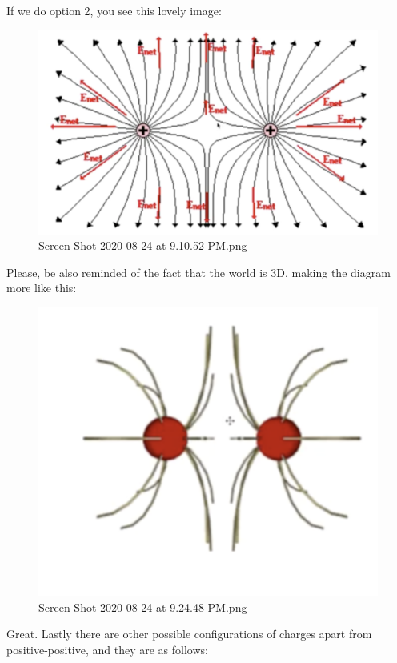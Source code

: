\documentclass[letterpaper]{article}
\begin{document}
If we do option 2, you see this lovely image:

\begin{figure}[htbp]
\centering
\includegraphics[width=.9\linewidth]{./Screen Shot 2020-08-24 at 9.10.52 PM.png}
\caption{Screen Shot 2020-08-24 at 9.10.52 PM.png}
\end{figure}

Please, be also reminded of the fact that the world is 3D, making the
diagram more like this:

\begin{figure}[htbp]
\centering
\includegraphics[width=.9\linewidth]{./Screen Shot 2020-08-24 at 9.24.48 PM.png}
\caption{Screen Shot 2020-08-24 at 9.24.48 PM.png}
\end{figure}

Great. Lastly there are other possible configurations of charges apart
from positive-positive, and they are as follows:
\end{document}
